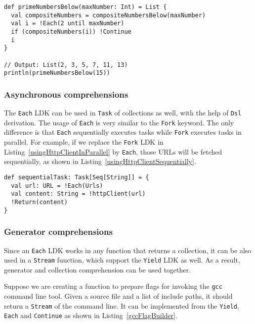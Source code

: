 \begin{lstlisting}[caption={Calculating all prime numbers below $n$ with \lstinline{Each} and \lstinline{Continue} LDK},label={primeNumbersBelow}]
def primeNumbersBelow(maxNumber: Int) = List {
  val compositeNumbers = compositeNumbersBelow(maxNumber)
  val i = !Each(2 until maxNumber)
  if (compositeNumbers(i)) !Continue
  i
}

// Output: List(2, 3, 5, 7, 11, 13)
println(primeNumbersBelow(15))
\end{lstlisting}

\subsubsection{Asynchronous comprehensions}\label{Asynchronous comprehensions}

The \lstinline{Each} LDK can be used in \lstinline{Task} of collections as well, with the help of \lstinline{Dsl} derivation. The usage of \lstinline{Each} is very similar to the \lstinline{Fork} keyword. The only difference is that \lstinline{Each} sequentially executes tasks while \lstinline{Fork} executes tasks in parallel. For example, if we replace the \lstinline{Fork} LDK in Listing~\ref{usingHttpClientInParallel} by \lstinline{Each}, those URLs will be fetched sequentially, as shown in Listing~\ref{usingHttpClientSequentially}.

\begin{lstlisting}[caption={Using HTTP client in parallel},label={usingHttpClientSequentially}]
def sequentialTask: Task[Seq[String]] = {
  val url: URL = !Each(Urls)
  val content: String = !httpClient(url)
  !Return(content)
}
\end{lstlisting}

\subsubsection{Generator comprehensions}\label{Generator comprehensions}

Since an \lstinline{Each} LDK works in any function that returns a collection, it can be also used in a \lstinline{Stream} function, which support the \lstinline{Yield} LDK as well. As a result, generator and collection comprehension can be used together.

Suppose we are creating a function to prepare flags for invoking the \texttt{gcc} command line tool. Given a source file and a list of include paths, it should return a \lstinline{Stream} of the command line.
It can be implemented from the \lstinline{Yield}, \lstinline{Each} and \lstinline{Continue} as shown in Listing~\ref{gccFlagBuilder}.

